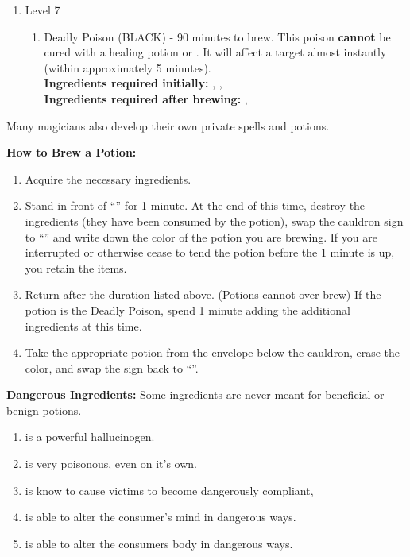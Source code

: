 \documentclass[green]{NeptuneBall}
\begin{document}
\begin{enumerate}
\begin{enumerate}
    \end{enumerate}
   \item Level 7
    \begin{enumerate}
      \item Deadly Poison (BLACK) - 90 minutes to brew. This poison {\bf cannot} be cured with a healing potion or \aFirstAid{}. It will affect a target almost instantly (within approximately 5 minutes).\\
      {\bf Ingredients required initially:} \iIceFish{}, \iElectricEel{}, \iSwordfish{}\\
       {\bf Ingredients required after brewing:} \iSnails{}, \iDeepClam{}\\
    \end{enumerate}
\end{enumerate}
Many magicians also develop their own private spells and potions.

{\bf How to Brew a Potion:}\\ %
\begin{enumerate}
  \item Acquire the necessary ingredients.
  \item Stand in front of ``\sEmptyCauldron{}'' for 1 minute. At the end of this time, destroy the ingredients (they have been consumed by the potion), swap the cauldron sign to ``\sFullCauldron{}'' and write down the color of the potion you are brewing. If you are interrupted or otherwise cease to tend the potion before the 1 minute is up, you retain the items.
  \item Return after the duration listed above. (Potions cannot over brew) If the potion is the Deadly Poison, spend 1 minute adding the additional ingredients at this time.
  \item Take the appropriate potion from the envelope below the cauldron, erase the color, and swap the sign back to ``\sEmptyCauldron{}''.
\end{enumerate}


{\bf Dangerous Ingredients:}
Some ingredients are never meant for beneficial or benign potions. 
\begin{enumerate}
\item \iHemlock{} is a powerful hallucinogen.  %
\item \iSnails{} is very poisonous, even on it's own. %
\item \iPearl{} is  know to cause victims to become dangerously compliant, %
\item \iManOfWar{} is able to alter the consumer's mind in dangerous ways. %
\item \iSquid{} is able to alter the consumers body in dangerous ways.  %
\end{enumerate}
\end{document}

